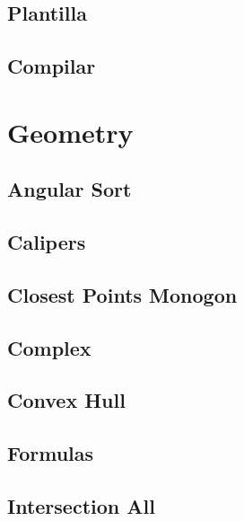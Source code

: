 \documentclass[10pt,portrait,twocolumn,a4paper,notitlepage]{article}
\newcommand\cppfile[2][]{%
\ifstrempty{#1}{}{}%
}
\newcommand\pythonfile[2][]{%
\ifstrempty{#1}{}{}%
}
\begin{document}
\subsection{Plantilla}
\cppfile{general_clean/plantilla.cpp}

\subsection{Compilar}
\pythonfile{general_clean/compilar.sh}


\section{Geometry}

\subsection{Angular Sort}
\cppfile{geometry_clean/angular_sort.cpp}

\subsection{Calipers}
\cppfile{geometry_clean/calipers.cpp}

\subsection{Closest Points Monogon}
\cppfile{geometry_clean/closest_points_Monogon.cpp}

\subsection{Complex}
\cppfile{geometry_clean/complex.cpp}

\subsection{Convex Hull}
\cppfile{geometry_clean/convex_hull.cpp}

\subsection{Formulas}
\cppfile{geometry_clean/formulas.cpp}

\subsection{Intersection All}
\cppfile{geometry_clean/intersection_all.cpp}
\end{document}
